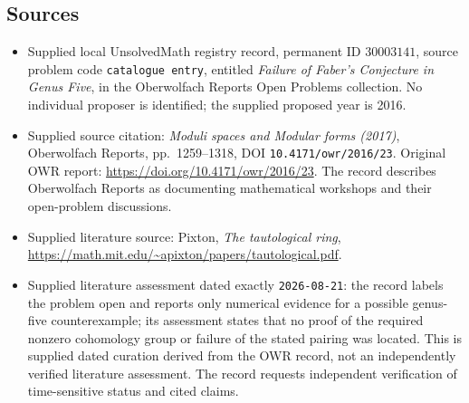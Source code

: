 \documentclass[11pt]{article}
\begin{document}
\subsection{Sources}
\begin{itemize}
\item Supplied local UnsolvedMath registry record, permanent ID \(30003141\), source problem code \texttt{catalogue entry}, entitled \emph{Failure of Faber's Conjecture in Genus Five}, in the Oberwolfach Reports Open Problems collection. No individual proposer is identified; the supplied proposed year is 2016.
\item Supplied source citation: \emph{Moduli spaces and Modular forms (2017)}, Oberwolfach Reports, pp.\ 1259--1318, DOI \texttt{10.4171/owr/2016/23}. Original OWR report: \url{https://doi.org/10.4171/owr/2016/23}. The record describes Oberwolfach Reports as documenting mathematical workshops and their open-problem discussions.
\item Supplied literature source: Pixton, \emph{The tautological ring}, \url{https://math.mit.edu/~apixton/papers/tautological.pdf}.
\item Supplied literature assessment dated exactly \texttt{2026-08-21}: the record labels the problem open and reports only numerical evidence for a possible genus-five counterexample; its assessment states that no proof of the required nonzero cohomology group or failure of the stated pairing was located. This is supplied dated curation derived from the OWR record, not an independently verified literature assessment. The record requests independent verification of time-sensitive status and cited claims.
\end{itemize}
\end{document}
